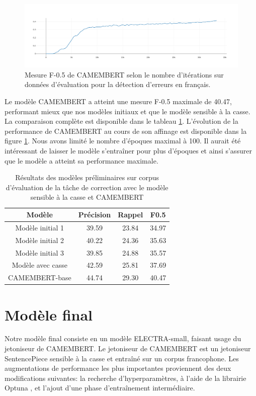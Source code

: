\documentclass[12pt,twoside,rapport]{dms}
\theoremstyle{definition}
\numberwithin{equation}{section}
\numberwithin{table}{chapter}
\numberwithin{figure}{chapter}
\begin{document}
\begin{figure}
	\begin{center}
		\includegraphics[width=1.0\textwidth]{figures/camembertbasef05100epoquesnat.png}
	\end{center}
	\caption{Mesure F-0.5 de CAMEMBERT selon le nombre d'itérations sur
		données d'évaluation pour la détection d'erreurs en
		français.}\label{fig:f05camembert}
\end{figure}

Le modèle CAMEMBERT a atteint une mesure F-0.5 maximale de 40.47, performant
mieux que nos modèles initiaux et que le modèle sensible à la casse. La
comparaison complète est disponible dans le tableau
\ref{table:perf_initiaux_camembert}. L'évolution de la performance de CAMEMBERT
au cours de son affinage est disponible dans la figure \ref{fig:f05camembert}.
Nous avons limité le nombre d'époques maximal à 100. Il aurait été intéressant
de laisser le modèle s'entraîner pour plus d'époques et ainsi s'assurer que le
modèle a atteint sa performance maximale.

\begin{table}
	\centering
	\begin{tabular}{||c | c | c | c||}
		\hline
		Modèle            & Précision & Rappel & F0.5  \\ [0.5ex]
		\hline\hline
		Modèle initial 1  & 39.59     & 23.84  & 34.97 \\
		Modèle initial 2  & 40.22     & 24.36  & 35.63 \\
		Modèle initial 3  & 39.85     & 24.88  & 35.57 \\
		Modèle avec casse & 42.59     & 25.81  & 37.69 \\
		CAMEMBERT-base    & 44.74     & 29.30  & 40.47 \\
		\hline
	\end{tabular}
	\caption{Résultats des modèles préliminaires sur corpus d'évaluation de la
		tâche de correction avec le modèle sensible à la casse et CAMEMBERT}
	\label{table:perf_initiaux_camembert}
\end{table}


\chapter{Modèle final}\label{chapitre:meilleurmodele}
Notre modèle final consiste en un modèle ELECTRA-small, faisant usage du
jetoniseur de CAMEMBERT. Le jetoniseur de CAMEMBERT est un jetoniseur
SentencePiece sensible à la casse et entraîné sur un corpus francophone. Les
augmentations de performance les plus importantes proviennent des deux
modifications suivantes: la recherche d'hyperparamètres, à l'aide de la
librairie Optuna \cite{akiba2019optuna}, et l'ajout d'une phase d'entraînement
intermédiaire.
\end{document}
